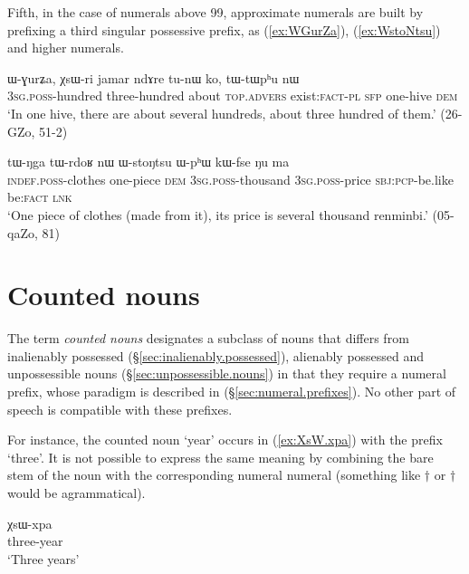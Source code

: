 Fifth, in the case of numerals above 99, approximate numerals are built by prefixing a third singular possessive  prefix, as  (\ref{ex:WGurZa}),  (\ref{ex:WstoNtsu}) and higher numerals.
 
\begin{exe}
\ex \label{ex:WGurZa}
\gll  ɯ-ɣurʑa, χsɯ-ri jamar ndɤre tu-nɯ ko, tɯ-tɯpʰu nɯ  \\
\textsc{3sg}.\textsc{poss}-hundred three-hundred about \textsc{top}.\textsc{advers} exist:\textsc{fact}-\textsc{pl} \textsc{sfp} one-hive \textsc{dem} \\
\glt `In one hive, there are about several hundreds, about three hundred of them.' (26-GZo, 51-2)
\end{exe}

\begin{exe}
\ex \label{ex:WstoNtsu}
\gll  tɯ-ŋga tɯ-rdoʁ nɯ ɯ-stoŋtsu ɯ-pʰɯ kɯ-fse ŋu ma \\
\textsc{indef}.\textsc{poss}-clothes one-piece \textsc{dem} \textsc{3sg}.\textsc{poss}-thousand \textsc{3sg}.\textsc{poss}-price \textsc{sbj}:\textsc{pcp}-be.like be:\textsc{fact} \textsc{lnk} \\ 
\glt `One piece of clothes (made from it), its price is several thousand renminbi.' (05-qaZo, 81)
\end{exe}

\section{Counted nouns} \label{sec:counted.nouns}
The term \textit{counted nouns} designates a subclass of nouns that differs from inalienably possessed (§\ref{sec:inalienably.possessed}), alienably possessed and unpossessible nouns (§\ref{sec:unpossessible.nouns}) in that they require a numeral prefix, whose paradigm is described in (§\ref{sec:numeral.prefixes}). No other part of speech is compatible with these prefixes.

For instance, the counted noun  `year' occurs in (\ref{ex:XsW.xpa}) with the prefix  `three'. It is not possible to express the same meaning by combining the bare stem of the noun  with the corresponding numeral numeral  (something  like  $\dagger$ or $\dagger$ would be agrammatical).

\begin{exe}
\ex \label{ex:XsW.xpa}
\gll χsɯ-xpa \\
three-year \\
\glt `Three years'
\end{exe}

